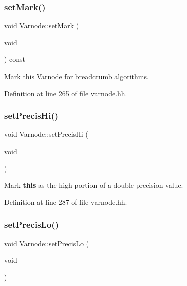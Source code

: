 \subsubsection{\texorpdfstring{setMark()}{setMark()}}
{\footnotesize\ttfamily void Varnode\+::set\+Mark (\begin{DoxyParamCaption}\item[{void}]{ }\end{DoxyParamCaption}) const\hspace{0.3cm}{\ttfamily [inline]}}



Mark this \mbox{\hyperlink{class_varnode}{Varnode}} for breadcrumb algorithms. 



Definition at line 265 of file varnode.\+hh.

\mbox{\label{class_varnode_ad7569812931abb759cd4150aab347f7f}} 
\subsubsection{\texorpdfstring{setPrecisHi()}{setPrecisHi()}}
{\footnotesize\ttfamily void Varnode\+::set\+Precis\+Hi (\begin{DoxyParamCaption}\item[{void}]{ }\end{DoxyParamCaption})\hspace{0.3cm}{\ttfamily [inline]}}



Mark {\bfseries{this}} as the high portion of a double precision value. 



Definition at line 287 of file varnode.\+hh.

\mbox{\label{class_varnode_a62d871a96ac123caa3b851738cf49760}} 
\subsubsection{\texorpdfstring{setPrecisLo()}{setPrecisLo()}}
{\footnotesize\ttfamily void Varnode\+::set\+Precis\+Lo (\begin{DoxyParamCaption}\item[{void}]{ }\end{DoxyParamCaption})\hspace{0.3cm}{\ttfamily [inline]}}



